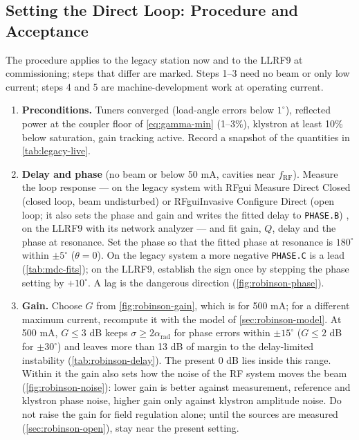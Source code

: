 \subsection{Setting the Direct Loop: Procedure and Acceptance}\label{sec:robinson-procedure}

The procedure applies to the legacy station now and to the LLRF9 at commissioning; steps that differ are marked. Steps 1--3 need no beam or only low current; steps 4 and 5 are machine-development work at operating current.

\begin{enumerate}
\item \textbf{Preconditions.} Tuners converged (load-angle errors below \(1^\circ\)), reflected power at the coupler floor of \cref{eq:gamma-min} (1--3\%), klystron at least 10\% below saturation, gain tracking active. Record a snapshot of the quantities in \cref{tab:legacy-live}.
\item \textbf{Delay and phase} (no beam or below 50 mA, cavities near \(f_\text{RF}\)). Measure the loop response --- on the legacy system with RFgui Measure Direct Closed (closed loop, beam undisturbed) or RFguiInvasive Configure Direct (open loop; it also sets the phase and gain and writes the fitted delay to \texttt{PHASE.B}) , on the LLRF9 with its network analyzer --- and fit gain, \(Q\), delay and the phase at resonance. Set the phase so that the fitted phase at resonance is \(180^\circ\) within \(\pm 5^\circ\) (\(\theta = 0\)). On the legacy system a more negative \texttt{PHASE.C} is a lead (\cref{tab:mdc-fits}); on the LLRF9, establish the sign once by stepping the phase setting by \(+10^\circ\). A lag is the dangerous direction (\cref{fig:robinson-phase}).
\item \textbf{Gain.} Choose \(G\) from \cref{fig:robinson-gain}, which is for 500 mA; for a different maximum current, recompute it with the model of \cref{sec:robinson-model}. At 500 mA, \(G \le 3\) dB keeps \(\sigma \ge 2\alpha_\text{rad}\) for phase errors within \(\pm 15^\circ\) (\(G \le 2\) dB for \(\pm 30^\circ\)) and leaves more than 13 dB of margin to the delay-limited instability (\cref{tab:robinson-delay}). The present 0 dB lies inside this range. Within it the gain also sets how the noise of the RF system moves the beam (\cref{fig:robinson-noise}): lower gain is better against measurement, reference and klystron phase noise, higher gain only against klystron amplitude noise. Do not raise the gain for field regulation alone; until the sources are measured (\cref{sec:robinson-open}), stay near the present setting.

\end{enumerate}
